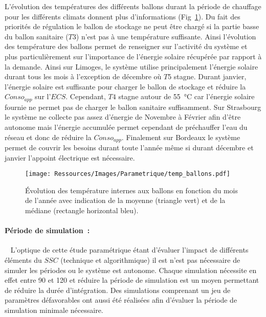 L’évolution des températures des différents ballons durant la période de chauffage pour
les différents climats donnent plus d’informations (Fig~\ref{fig:temp_ballon_mensuel}). Du
fait des priorités de régulation le ballon de stockage ne peut être chargé si la partie
basse du ballon sanitaire ($T3$) n’est pas à une température suffisante. Ainsi l’évolution
des température des ballons permet de renseigner sur l’activité du système et plus
particulièrement sur l’importance de l’énergie solaire récupérée par rapport à la demande.
Ainsi sur Limoges, le système utilise principalement l’énergie solaire durant tous les
mois à l’exception de décembre où $T5$ stagne. Durant janvier, l’énergie solaire est
suffisante pour charger le ballon de stockage et réduire la $Conso_{app}$ sur
l’$ECS$. Cependant, $T4$ stagne autour de \SI{55}{\celsius} car l’énergie solaire fournie
ne permet pas de charger le ballon sanitaire suffisamment. Sur Strasbourg le système ne
collecte pas assez d’énergie de Novembre à Février afin d’être autonome mais l’énergie
accumulée permet cependant de préchauffer l’eau du réseau et donc de réduire la
$Conso_{app}$. Finalement sur Bordeaux le système permet de couvrir les besoins
durant toute l’année même si durant décembre et janvier l’appoint électrique est
nécessaire.

\begin{figure}
    \begin{center}
        \texttt{[image: Ressources/Images/Parametrique/temp\_ballons.pdf]}
    \end{center}
    \caption{Évolution des température internes aux ballons en fonction du mois
             de l’année avec indication de la moyenne (triangle vert) et
             de la médiane (rectangle horizontal bleu).
             \label{fig:temp_ballon_mensuel}}
\end{figure}


\paragraph{Période de simulation~:} %
\label{par:période_de_simulation}
~
L’optique de cette étude paramétrique étant d’évaluer l’impact de différents
éléments du $SSC$ (technique et algorithmique) il est n’est pas nécessaire de simuler les
périodes ou le système est autonome. Chaque simulation nécessite en effet entre
\SI{90}{\min} et \SI{120}{\min} et réduire la période de simulation est un moyen
permettant de réduire la durée d’intégration. Des simulations comprenant un jeu de
paramètres défavorables ont aussi été réalisées afin d’évaluer la période de simulation
minimale nécessaire.

